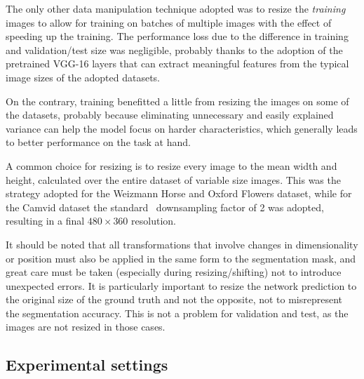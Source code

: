 The only other data manipulation technique adopted was to resize the
\emph{training} images to allow for training on batches of multiple images with
the effect of speeding up the training. The performance loss due to the
difference in training and validation/test size was negligible, probably thanks
to the adoption of the pretrained VGG-16 layers that can extract meaningful
features from the typical image sizes of the adopted datasets.

On the contrary, training benefitted a little from resizing the images on some
of the datasets, probably because eliminating unnecessary and easily explained
variance can help the model focus on harder characteristics, which generally
leads to better performance on the task at hand.

A common choice for resizing is to resize every image to the mean width and
height, calculated over the entire dataset of variable size images. This was
the strategy adopted for the Weizmann Horse and Oxford Flowers dataset, while
for the Camvid dataset the standard~\cite{badrinarayanan2015segnet}
downsampling factor of 2 was adopted, resulting in a final $480 \times 360$
resolution.

It should be noted that all transformations that involve changes in
dimensionality or position must also be applied in the same form to the
segmentation mask, and great care must be taken (especially during
resizing/shifting) not to introduce unexpected errors. It is particularly
important to resize the network prediction to the original size of the ground
truth and not the opposite, not to misrepresent the segmentation accuracy.
This is not a problem for validation and test, as the images are not resized in
those cases.

\subsection{Experimental settings}

